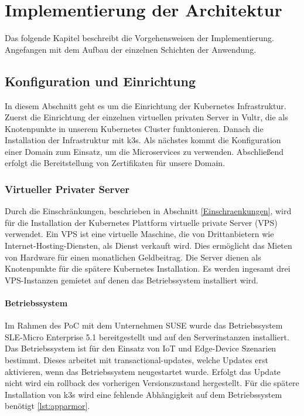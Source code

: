 \chapter{Implementierung der Architektur}

Das folgende Kapitel beschreibt die Vorgehensweisen der Implementierung.
Angefangen mit dem Aufbau der einzelnen Schichten der Anwendung.


\section{Konfiguration und Einrichtung}

In diesem Abschnitt geht es um die Einrichtung der Kubernetes Infrastruktur.
Zuerst die Einrichtung der einzelnen virtuellen privaten Server in Vultr, die als Knotenpunkte in unserem Kubernetes Cluster funktonieren.
Danach die Installation der Infrastruktur mit k3s.
Als nächstes kommt die Konfiguration einer Domain zum Einsatz, um die Microservices zu verwenden.
Abschließend erfolgt die Bereitstellung von Zertifikaten für unsere Domain.

\subsection{Virtueller Privater Server}

Durch die Einschränkungen, beschrieben in Abschnitt \ref{Einschraenkungen},
wird für die Installation der Kubernetes Plattform virtuelle private Server (VPS) verwendet.
Ein VPS ist eine virtuelle Maschine, die von Drittanbietern wie Internet-Hosting-Diensten, als Dienst verkauft wird.
Dies ermöglicht das Mieten von Hardware für einen monatlichen Geldbeitrag.
Die Server dienen als Knotenpunkte für die spätere Kubernetes Installation.
Es werden ingesamt drei VPS-Instanzen gemietet auf denen das Betriebssystem installiert wird.

\subsubsection{Betriebssystem}
Im Rahmen des PoC mit dem Unternehmen SUSE wurde das 
Betriebssystem SLE-Micro Enterprise 5.1 bereitgestellt und auf den Serverinstanzen installiert.
Das Betriebssystem ist für den Einsatz von IoT und Edge-Device Szenarien bestimmt.
Dieses arbeitet mit transactional-updates, welche Updates erst aktivieren, wenn das Betriebssystem neugestartet wurde. 
Erfolgt das Update nicht wird ein rollback des vorherigen Versionszustand hergestellt.
Für die spätere Installation von k3s wird eine fehlende Abhängigkeit auf dem Betriebssystem benötigt \ref{lst:apparmor}.

